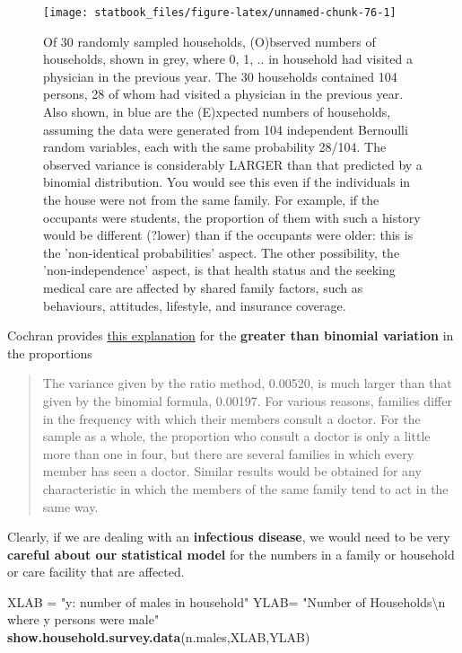 \documentclass[]{book}
\newenvironment{Shaded}{\begin{snugshade}}{\end{snugshade}}
\newcommand{\CharTok}[1]{\textcolor[rgb]{0.31,0.60,0.02}{#1}}
\newcommand{\KeywordTok}[1]{\textcolor[rgb]{0.13,0.29,0.53}{\textbf{#1}}}
\newcommand{\NormalTok}[1]{#1}
\newcommand{\StringTok}[1]{\textcolor[rgb]{0.31,0.60,0.02}{#1}}
\begin{document}
\begin{figure}

\texttt{[image: statbook\_files/figure-latex/unnamed-chunk-76-1]} \hfill{}

\caption{Of 30 randomly sampled households, (O)bserved  numbers of households, shown in grey, where 0, 1, .. in household had visited  a physician in the previous year. The 30 households contained 104 persons, 28 of whom had visited a physician in the previous year. Also shown, in blue are the (E)xpected numbers of households, assuming the data were generated from 104 independent Bernoulli random variables, each with the same  probability 28/104. The observed variance is considerably LARGER than that predicted by a binomial distribution. You would see this even if the individuals in the house were not from the same family. For example, if the occupants were students, the proportion of them with such a history would be different (?lower) than if the occupants were older: this is the 'non-identical probabilities' aspect. The other possibility, the 'non-independence' aspect, is that health status and the seeking medical care are affected by shared family factors, such as behaviours, attitudes, lifestyle, and insurance coverage.}\label{fig:unnamed-chunk-76}
\end{figure}

Cochran provides \href{http://www.biostat.mcgill.ca/hanley/statbook/CochranHouseholdSurvey.png}{this explanation} for the \textbf{greater than binomial variation} in the proportions

\begin{quote}
The variance given by the ratio method, 0.00520, is much larger than that given by the binomial formula, 0.00197. For various reasons, families differ in the frequency with which their members consult a doctor. For the sample as a whole, the proportion who consult a doctor is only a little more than one in four, but there are several families in which every member has seen a doctor. Similar results would be obtained for any characteristic in which the members of the same family tend to act in the same way.
\end{quote}

Clearly, if we are dealing with an \textbf{infectious disease}, we would need to be very \textbf{careful about our statistical model} for the numbers in a family or household or care facility that are affected.

\begin{Shaded}
\begin{Highlighting}[]
\NormalTok{XLAB =}\StringTok{ "y: number of males in household"}
\NormalTok{YLAB=}\StringTok{  "Number of Households}\CharTok{\textbackslash{}n}\StringTok{ where y persons were male"}
\KeywordTok{show.household.survey.data}\NormalTok{(n.males,XLAB,YLAB)}
\end{Highlighting}
\end{Shaded}
\end{document}
